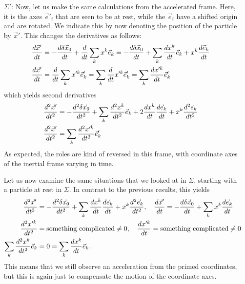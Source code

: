 \documentclass[../class_mech_main.tex]{subfiles}
\begin{document}
\begin{itemize}
	\item[$\Sigma'$:] Now, let us make the same calculations from the accelerated frame. Here, it is the axes $\vec{e}'_i$ that are seen to be at rest, while the $\vec{e}_i$ have a shifted origin and are rotated. We indicate this by now denoting the position of the particle by $\vec{x}'$. This changes the derivatives as follows:
	\begin{align}
		\dv{\vec{x}'}{t} &= -\dv{\delta \vec{x}_0}{t} + \dv{t} \sum_k x^k\vec{e}_k = -\dv{\delta \vec{x}_0}{t} + \sum_k \dv{x^k}{t} \vec{e}_k + x^k \dv{\vec{e}_k}{t}
		\label{eq:velocity_from_accel_frame_in_inert_frame}
		\\
		\dv{\vec{x}'}{t} &= \dv{t} \sum_k x'^k \vec{e}'_k = \sum_k \dv{t} x'^k \vec{e}'_k = \sum_k \dv{x'^k}{t} \vec{e}'_k
		\label{eq:velocity_from_accel_frame_in_accel_frame}
	\end{align}
	which yields second derivatives
	\begin{align}
		\dv[2]{\vec{x}'}{t} &= -\dv[2]{\delta \vec{x}_0}{t} + \sum_k \dv[2]{x^k}{t} \vec{e}_k + 2 \dv{x^k}{t} \dv{\vec{e}_k}{t} + x^k \dv[2]{\vec{e}_k}{t}
		\label{eq:acceleration_from_accel_frame_in_inert_frame}
		\\
		\dv[2]{\vec{x}'}{t} &= \sum_k \dv[2]{x'^k}{t} \vec{e}'_k
		\label{eq:acceleration_from_accel_frame_in_accel_frame}
	\end{align}
	As expected, the roles are kind of reversed in this frame, with coordinate axes of the inertial frame varying in time.


	Let us now examine the same situations that we looked at in $\Sigma$, starting with a particle at rest in $\Sigma$. In contrast to the previous results, this yields
	\begin{align*}
		\dv[2]{\vec{x}'}{t} &= -\dv[2]{\delta \vec{x}_0}{t} + \sum_k \dv{x^k}{t} \dv{\vec{e}_k}{t} + x^k \dv[2]{\vec{e}_k}{t},
		\quad \dv{\vec{x}'}{t} = -\dv{\delta \vec{x}_0}{t} + \sum_k x^k \dv{\vec{e}_k}{t}
		\\
		\dv[2]{x'^k}{t} &= \text{something complicated} \neq 0,
		\quad \dv{x'^k}{t} = \text{something complicated} \neq 0
		\\
		\sum_k \dv[2]{x^k}{t} \vec{e}_k &= 0 = \sum_k \dv{x^k}{t} \vec{e}_k \, .
	\end{align*}
	This means that we still observe an acceleration from the primed coordinates, but this is again just to compensate the motion of the coordinate axes.


\end{itemize}
\end{document}
